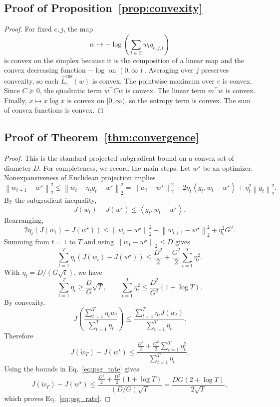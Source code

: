 \documentclass{article}
\theoremstyle{definition}
\newcommand{\cC}{\mathcal{C}}
\newcommand{\norm}[1]{\left\lVert #1 \right\rVert}
\newcommand{\inner}[2]{\left\langle #1, #2 \right\rangle}
\newcommand{\paren}[1]{\left( #1 \right)}
\begin{document}
\subsection{Proof of Proposition~\ref{prop:convexity}}

\begin{proof}
For fixed \(e,j\), the map
\[
w \mapsto -\log\paren{\sum_{t\in\cC} w_t q_{e,j,t}}
\]
is convex on the simplex because it is the composition of a linear map and the convex decreasing function \(-\log\) on \((0,\infty)\). Averaging over \(j\) preserves convexity, so each \(\widehat L_e^{\mathrm{ens}}(w)\) is convex. The pointwise maximum over \(e\) is convex. Since \(C\succeq 0\), the quadratic term \(w^\top C w\) is convex. The linear term \(m^\top w\) is convex. Finally, \(x\mapsto x\log x\) is convex on \([0,\infty)\), so the entropy term is convex. The sum of convex functions is convex.
\end{proof}

\subsection{Proof of Theorem~\ref{thm:convergence}}

\begin{proof}
This is the standard projected-subgradient bound on a convex set of diameter \(D\). For completeness, we record the main steps. Let \(w^\star\) be an optimizer. Nonexpansiveness of Euclidean projection implies
\[
\norm{w_{t+1}-w^\star}_2^2
\le
\norm{w_t-\eta_t g_t-w^\star}_2^2
=
\norm{w_t-w^\star}_2^2
-2\eta_t \inner{g_t}{w_t-w^\star}
+ \eta_t^2 \norm{g_t}_2^2.
\]
By the subgradient inequality,
\[
J(w_t)-J(w^\star)\le \inner{g_t}{w_t-w^\star}.
\]
Rearranging,
\[
2\eta_t \paren{J(w_t)-J(w^\star)}
\le
\norm{w_t-w^\star}_2^2
-\norm{w_{t+1}-w^\star}_2^2
+\eta_t^2 G^2.
\]
Summing from \(t=1\) to \(T\) and using \(\norm{w_1-w^\star}_2\le D\) gives
\[
\sum_{t=1}^{T} \eta_t \paren{J(w_t)-J(w^\star)}
\le
\frac{D^2}{2}
+ \frac{G^2}{2}\sum_{t=1}^{T}\eta_t^2.
\]
With \(\eta_t=D/(G\sqrt t)\), we have
\[
\sum_{t=1}^{T}\eta_t \ge \frac{D}{G}\sqrt T,
\qquad
\sum_{t=1}^{T}\eta_t^2 \le \frac{D^2}{G^2}(1+\log T).
\]
By convexity,
\[
J\!\paren{\frac{\sum_{t=1}^{T}\eta_t w_t}{\sum_{t=1}^{T}\eta_t}}
\le
\frac{\sum_{t=1}^{T}\eta_t J(w_t)}{\sum_{t=1}^{T}\eta_t}.
\]
Therefore
\[
J(\tilde w_T)-J(w^\star)
\le
\frac{\frac{D^2}{2}+\frac{G^2}{2}\sum_{t=1}^{T}\eta_t^2}{\sum_{t=1}^{T}\eta_t}.
\]
Using the bounds in Eq.~\eqref{eq:psg_rate} gives
\[
J(\tilde w_T)-J(w^\star)
\le
\frac{\frac{D^2}{2}+\frac{D^2}{2}(1+\log T)}{(D/G)\sqrt{T}}
=
\frac{DG(2+\log T)}{2\sqrt{T}},
\]
which proves Eq.~\eqref{eq:psg_rate}.
\end{proof}
\end{document}
